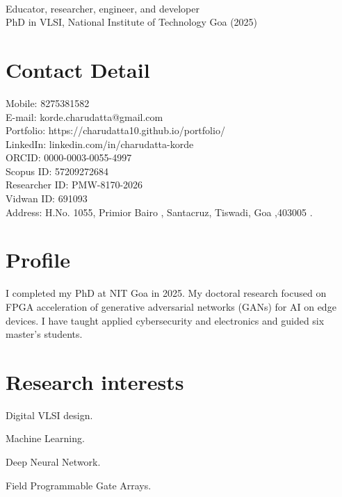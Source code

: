 \documentclass[fontsize=11pt]{tccv}
\begin{document}
\\
Educator, researcher, engineer, and developer\\
PhD in VLSI, National Institute of Technology Goa (2025)\\
\section{Contact Detail}
\begin{flushleft} Mobile: 8275381582\\
E-mail: korde.charudatta@gmail.com\\
Portfolio: https://charudatta10.github.io/portfolio/\\
LinkedIn: linkedin.com/in/charudatta-korde\\
ORCID: 0000-0003-0055-4997\\
Scopus ID: 57209272684\\
Researcher ID: PMW-8170-2026\\
Vidwan ID: 691093\\
Address: H.No. 1055, Primior Bairo ,
Santacruz, Tiswadi, Goa ,403005 .
\end{flushleft}
\vspace{1em}

\section{Profile}
I completed my PhD at NIT Goa in 2025. My doctoral research focused on FPGA acceleration of generative adversarial networks (GANs) for AI on edge devices. I have taught applied cybersecurity and electronics and guided six master's students.
\vspace{1em}

\section{Research interests}
\begin{skills}
    \item {Digital VLSI design.}
    \item {Machine Learning.}
    \item {Deep Neural Network.}
    \item {Field Programmable Gate Arrays.}
\end{skills}
\vspace{1em}
\end{document}
